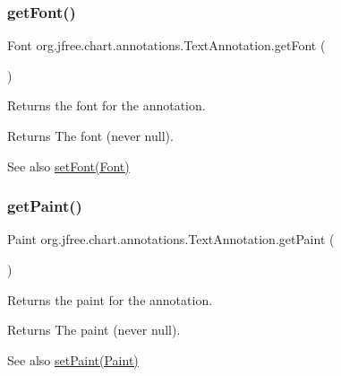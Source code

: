 \subsubsection{\texorpdfstring{get\+Font()}{getFont()}}
{\footnotesize\ttfamily Font org.\+jfree.\+chart.\+annotations.\+Text\+Annotation.\+get\+Font (\begin{DoxyParamCaption}{ }\end{DoxyParamCaption})}

Returns the font for the annotation.

\begin{DoxyReturn}{Returns}
The font (never {\ttfamily null}).
\end{DoxyReturn}
\begin{DoxySeeAlso}{See also}
\mbox{\hyperlink{classorg_1_1jfree_1_1chart_1_1annotations_1_1_text_annotation_a28b229e51ba0570b868db3c79f326d23}{set\+Font(\+Font)}} 
\end{DoxySeeAlso}
\mbox{\label{classorg_1_1jfree_1_1chart_1_1annotations_1_1_text_annotation_a2ee970d0b9a52455ed0054b120055620}} 
\subsubsection{\texorpdfstring{get\+Paint()}{getPaint()}}
{\footnotesize\ttfamily Paint org.\+jfree.\+chart.\+annotations.\+Text\+Annotation.\+get\+Paint (\begin{DoxyParamCaption}{ }\end{DoxyParamCaption})}

Returns the paint for the annotation.

\begin{DoxyReturn}{Returns}
The paint (never {\ttfamily null}).
\end{DoxyReturn}
\begin{DoxySeeAlso}{See also}
\mbox{\hyperlink{classorg_1_1jfree_1_1chart_1_1annotations_1_1_text_annotation_add0e38c4b928b8442d789f69f81beef1}{set\+Paint(\+Paint)}} 
\end{DoxySeeAlso}
\mbox{\label{classorg_1_1jfree_1_1chart_1_1annotations_1_1_text_annotation_ab97800ba02a4576842f56a1f3b665f53}} 
